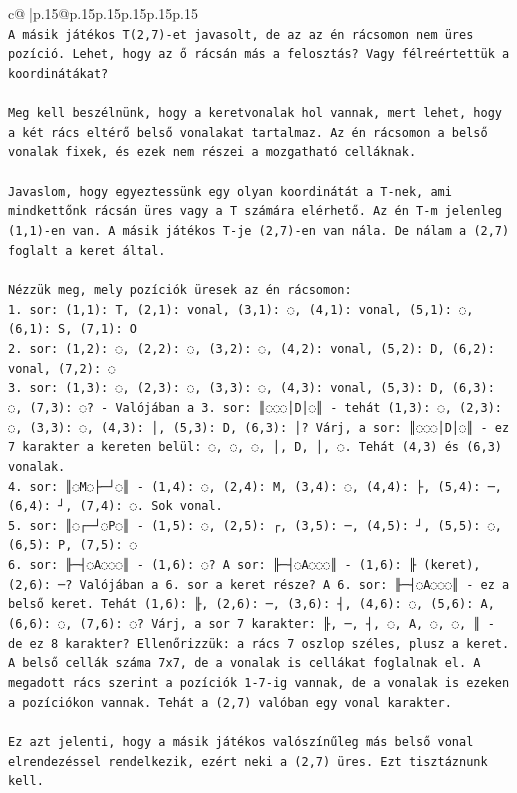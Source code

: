 \documentclass{article}
\begin{document}
{\begin{supertabular}{c@{$\;$}|p{.15\linewidth}@{}p{.15\linewidth}p{.15\linewidth}p{.15\linewidth}p{.15\linewidth}p{.15\linewidth}}
{{{\\ 
\texttt{A másik játékos T(2,7){-}et javasolt, de az az én rácsomon nem üres pozíció. Lehet, hogy az ő rácsán más a felosztás? Vagy félreértettük a koordinátákat?} \\
\\ 
\texttt{Meg kell beszélnünk, hogy a keretvonalak hol vannak, mert lehet, hogy a két rács eltérő belső vonalakat tartalmaz. Az én rácsomon a belső vonalak fixek, és ezek nem részei a mozgatható celláknak.} \\
\\ 
\texttt{Javaslom, hogy egyeztessünk egy olyan koordinátát a T{-}nek, ami mindkettőnk rácsán üres vagy a T számára elérhető. Az én T{-}m jelenleg (1,1){-}en van. A másik játékos T{-}je (2,7){-}en van nála. De nálam a (2,7) foglalt a keret által. } \\
\\ 
\texttt{Nézzük meg, mely pozíciók üresek az én rácsomon:} \\
\texttt{1. sor: (1,1): T, (2,1): vonal, (3,1): ◌, (4,1): vonal, (5,1): ◌, (6,1): S, (7,1): O} \\
\texttt{2. sor: (1,2): ◌, (2,2): ◌, (3,2): ◌, (4,2): vonal, (5,2): D, (6,2): vonal, (7,2): ◌} \\
\texttt{3. sor: (1,3): ◌, (2,3): ◌, (3,3): ◌, (4,3): vonal, (5,3): D, (6,3): ◌, (7,3): ◌? {-} Valójában a 3. sor: ║◌◌◌│D│◌║ {-} tehát (1,3): ◌, (2,3): ◌, (3,3): ◌, (4,3): │, (5,3): D, (6,3): │? Várj, a sor: ║◌◌◌│D│◌║ {-} ez 7 karakter a kereten belül: ◌, ◌, ◌, │, D, │, ◌. Tehát (4,3) és (6,3) vonalak.} \\
\texttt{4. sor: ║◌M◌├─┘◌║ {-} (1,4): ◌, (2,4): M, (3,4): ◌, (4,4): ├, (5,4): ─, (6,4): ┘, (7,4): ◌. Sok vonal.} \\
\texttt{5. sor: ║◌┌─┘◌P◌║ {-} (1,5): ◌, (2,5): ┌, (3,5): ─, (4,5): ┘, (5,5): ◌, (6,5): P, (7,5): ◌} \\
\texttt{6. sor: ╟─┤◌A◌◌◌║ {-} (1,6): ◌? A sor: ╟─┤◌A◌◌◌║ {-} (1,6): ╟ (keret), (2,6): ─? Valójában a 6. sor a keret része? A 6. sor: ╟─┤◌A◌◌◌║ {-} ez a belső keret. Tehát (1,6): ╟, (2,6): ─, (3,6): ┤, (4,6): ◌, (5,6): A, (6,6): ◌, (7,6): ◌? Várj, a sor 7 karakter: ╟, ─, ┤, ◌, A, ◌, ◌, ║ {-} de ez 8 karakter? Ellenőrizzük: a rács 7 oszlop széles, plusz a keret. A belső cellák száma 7x7, de a vonalak is cellákat foglalnak el. A megadott rács szerint a pozíciók 1{-}7{-}ig vannak, de a vonalak is ezeken a pozíciókon vannak. Tehát a (2,7) valóban egy vonal karakter.} \\
\\ 
\texttt{Ez azt jelenti, hogy a másik játékos valószínűleg más belső vonal elrendezéssel rendelkezik, ezért neki a (2,7) üres. Ezt tisztáznunk kell.} \\
}}}
\end{supertabular}}
\end{document}
